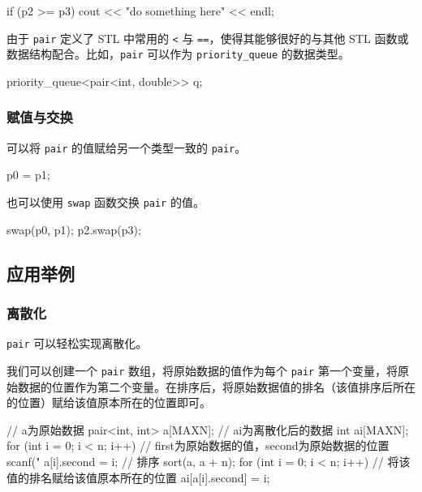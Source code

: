 \begin{codeline}
if (p2 >= p3) {
  cout << "do something here" << endl;
}
\end{codeline}


由于 \texttt{pair} 定义了 STL 中常用的 \texttt{\textless{}} 与 \texttt{==}，使得其能够很好的与其他 STL 函数或数据结构配合。比如，\texttt{pair} 可以作为 \texttt{priority\_queue} 的数据类型。


\begin{codeline}
priority_queue<pair<int, double>> q;
\end{codeline}


\subsubsection{赋值与交换}\label{ux8d4bux503cux4e0eux4ea4ux6362}

可以将 \texttt{pair} 的值赋给另一个类型一致的 \texttt{pair}。


\begin{codeline}
p0 = p1;
\end{codeline}


也可以使用 \texttt{swap} 函数交换 \texttt{pair} 的值。


\begin{codeline}
swap(p0, p1);
p2.swap(p3);
\end{codeline}


\subsection{应用举例}\label{ux5e94ux7528ux4e3eux4f8b}

\subsubsection{离散化}\label{ux79bbux6563ux5316}

\texttt{pair} 可以轻松实现离散化。

我们可以创建一个 \texttt{pair} 数组，将原始数据的值作为每个 \texttt{pair} 第一个变量，将原始数据的位置作为第二个变量。在排序后，将原始数据值的排名（该值排序后所在的位置）赋给该值原本所在的位置即可。


\begin{codeline}
// a为原始数据
pair<int, int> a[MAXN];
// ai为离散化后的数据
int ai[MAXN];
for (int i = 0; i < n; i++) {
  // first为原始数据的值，second为原始数据的位置
  scanf("%
  a[i].second = i;
}
// 排序
sort(a, a + n);
for (int i = 0; i < n; i++) {
  // 将该值的排名赋给该值原本所在的位置
  ai[a[i].second] = i;
}
\end{codeline}


